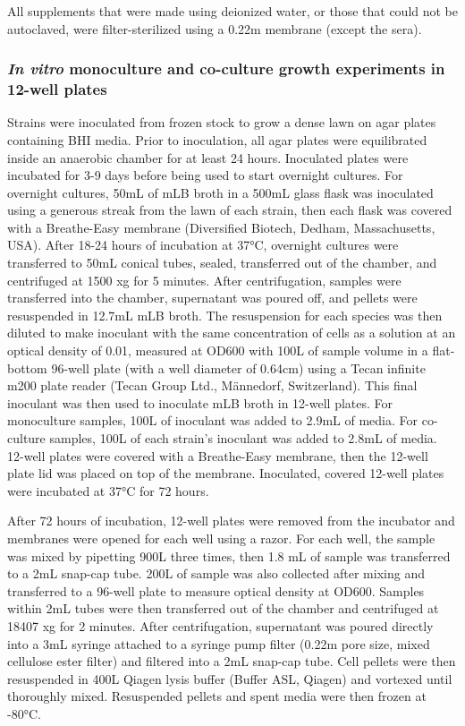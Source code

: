 \documentclass[11pt,twocolumn,notitlepage,openany,twoside]{book}
\begin{document}
\begin{refsection}
All supplements that were made using deionized water, or those that could not be autoclaved, were filter-sterilized using a 0.22{\textmu}m membrane (except the sera).

\subsubsection{\textit{In vitro} monoculture and co-culture growth experiments in 12-well plates}

Strains were inoculated from frozen stock to grow a dense lawn on agar plates containing BHI media. Prior to inoculation, all agar plates were equilibrated inside an anaerobic chamber for at least 24 hours. Inoculated plates were incubated for 3-9 days before being used to start overnight cultures. For overnight cultures, 50mL of mLB broth in a 500mL glass flask was inoculated using a generous streak from the lawn of each strain, then each flask was covered with a Breathe-Easy membrane (Diversified Biotech, Dedham, Massachusetts, USA). After 18-24 hours of incubation at 37°C, overnight cultures were transferred to 50mL conical tubes, sealed, transferred out of the chamber, and centrifuged at 1500 xg for 5 minutes. After centrifugation, samples were transferred into the chamber, supernatant was poured off, and pellets were resuspended in 12.7mL mLB broth. The resuspension for each species was then diluted to make inoculant with the same concentration of cells as a solution at an optical density of 0.01, measured at OD600 with 100{\textmu}L of sample volume in a flat-bottom 96-well plate (with a well diameter of 0.64cm) using a Tecan infinite m200 plate reader (Tecan Group Ltd., Männedorf, Switzerland). This final inoculant was then used to inoculate mLB broth in 12-well plates. For monoculture samples, 100{\textmu}L of inoculant was added to 2.9mL of media. For co-culture samples, 100{\textmu}L of each strain’s inoculant was added to 2.8mL of media. 12-well plates were covered with a Breathe-Easy membrane, then the 12-well plate lid was placed on top of the membrane. Inoculated, covered 12-well plates were incubated at 37°C for 72 hours.

After 72 hours of incubation, 12-well plates were removed from the incubator and membranes were opened for each well using a razor. For each well, the sample was mixed by pipetting 900{\textmu}L three times, then 1.8 mL of sample was transferred to a 2mL snap-cap tube. 200{\textmu}L of sample was also collected after mixing and transferred to a 96-well plate to measure optical density at OD600. Samples within 2mL tubes were then transferred out of the chamber and centrifuged at 18407 xg for 2 minutes. After centrifugation, supernatant was poured directly into a 3mL syringe attached to a syringe pump filter (0.22{\textmu}m pore size, mixed cellulose ester filter) and filtered into a 2mL snap-cap tube. Cell pellets were then resuspended in 400{\textmu}L Qiagen lysis buffer (Buffer ASL, Qiagen) and vortexed until thoroughly mixed. Resuspended pellets and spent media were then frozen at -80°C.


\end{refsection}
\end{document}

